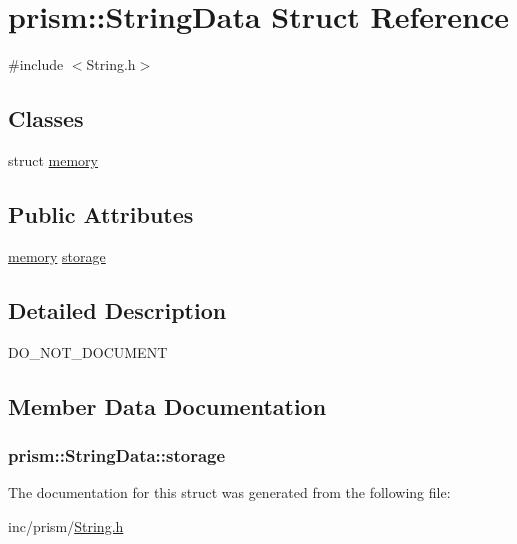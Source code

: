 \hypertarget{structprism_1_1_string_data}{}\section{prism\+:\+:String\+Data Struct Reference}
\label{structprism_1_1_string_data}


{\ttfamily \#include $<$String.\+h$>$}

\subsection*{Classes}
\begin{DoxyCompactItemize}
\item 
struct \hyperlink{structprism_1_1_string_data_1_1memory}{memory}
\end{DoxyCompactItemize}
\subsection*{Public Attributes}
\begin{DoxyCompactItemize}
\item 
\hyperlink{structprism_1_1_string_data_1_1memory}{memory} \hyperlink{structprism_1_1_string_data_afe8efdbe7e9f6a6913dc51bd9177dc0e}{storage}
\end{DoxyCompactItemize}


\subsection{Detailed Description}
D\+O\+\_\+\+N\+O\+T\+\_\+\+D\+O\+C\+U\+M\+E\+NT 

\subsection{Member Data Documentation}
\subsubsection[{\texorpdfstring{storage}{storage}}]{ prism\+::\+String\+Data\+::storage}\hypertarget{structprism_1_1_string_data_afe8efdbe7e9f6a6913dc51bd9177dc0e}{}\label{structprism_1_1_string_data_afe8efdbe7e9f6a6913dc51bd9177dc0e}


The documentation for this struct was generated from the following file\+:\begin{DoxyCompactItemize}
\item 
inc/prism/\hyperlink{_string_8h}{String.\+h}\end{DoxyCompactItemize}

